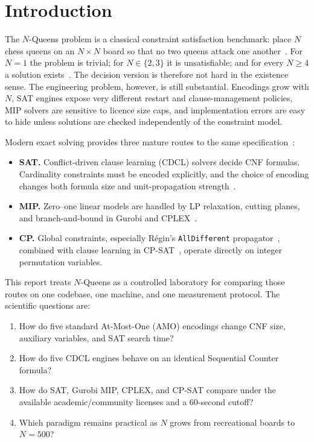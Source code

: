 \documentclass[a4paper,fleqn]{cas-sc}
\begin{document}
\section{Introduction}
\label{sec:intro}

The $N$-Queens problem is a classical constraint satisfaction benchmark: place $N$ chess queens on an $N\times N$ board so that no two queens attack one another~\cite{bell2009survey,sosic1994local}.
For $N=1$ the problem is trivial; for $N\in\{2,3\}$ it is unsatisfiable; and for every $N\ge 4$ a solution exists~\cite{bell2009survey}.
The decision version is therefore not hard in the existence sense.
The engineering problem, however, is still substantial.
Encodings grow with $N$, SAT engines expose very different restart and clause-management policies, MIP solvers are sensitive to licence size caps, and implementation errors are easy to hide unless solutions are checked independently of the constraint model.

Modern exact solving provides three mature routes to the same specification~\cite{biere2021handbook}:
\begin{itemize}
    \item \textbf{SAT.} Conflict-driven clause learning (CDCL) solvers decide CNF formulas.
    Cardinality constraints must be encoded explicitly, and the choice of encoding changes both formula size and unit-propagation strength~\cite{sinz2005towards,ignatiev2018pysat,audemard2018glucose}.
    \item \textbf{MIP.} Zero--one linear models are handled by LP relaxation, cutting planes, and branch-and-bound in Gurobi and CPLEX~\cite{gurobi2024,cplex2024}.
    \item \textbf{CP.} Global constraints, especially R{\'e}gin's \texttt{AllDifferent} propagator~\cite{regin1994filtering}, combined with clause learning in CP-SAT~\cite{perron2024ortools}, operate directly on integer permutation variables.
\end{itemize}

This report treats $N$-Queens as a controlled laboratory for comparing those routes on one codebase, one machine, and one measurement protocol.
The scientific questions are:
\begin{enumerate}
    \item How do five standard At-Most-One (AMO) encodings change CNF size, auxiliary variables, and SAT search time?
    \item How do five CDCL engines behave on an identical Sequential Counter formula?
    \item How do SAT, Gurobi MIP, CPLEX, and CP-SAT compare under the available academic/community licenses and a 60-second cutoff?
    \item Which paradigm remains practical as $N$ grows from recreational boards to $N=500$?
\end{enumerate}
\end{document}
